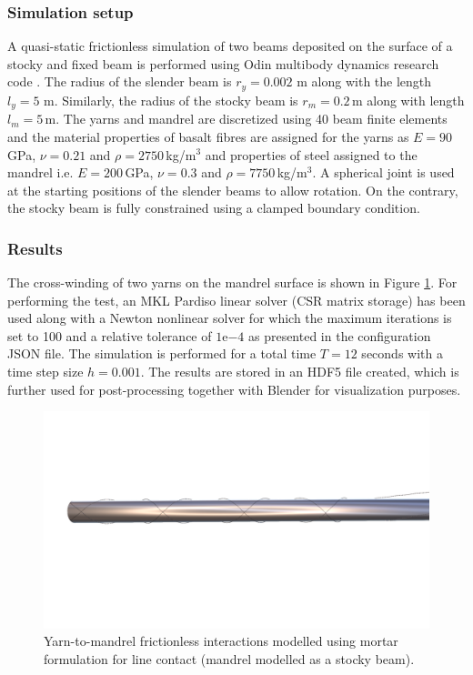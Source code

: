 \subsubsection{Simulation setup}
A quasi-static frictionless simulation of two beams deposited on the surface of a stocky and fixed beam is performed using Odin multibody dynamics research code \cite{odin2022}. The radius of the slender beam is $r_y = 0.002$ m along with the length $l_y = 5$ m. Similarly, the radius of the stocky beam is $r_m = 0.2\,$m along with length $l_m = 5\,$m. The yarns and mandrel are discretized using 40 beam finite elements and the material properties of basalt fibres are assigned for the yarns as $E = 90\,$GPa, $\nu = 0.21$ and $\rho = 2750\,$kg/m$^3$ and properties of steel assigned to the mandrel i.e. $E = 200\,$GPa, $\nu = 0.3$ and $\rho = 7750\,$kg/m$^3$. A spherical joint is used at the starting positions of the slender beams to allow rotation. On the contrary, the stocky beam is fully constrained using a clamped boundary condition.

\subsubsection{Results}
The cross-winding of two yarns on the mandrel surface is shown in Figure \ref{testsetup}. For performing the test, an MKL Pardiso linear solver (CSR matrix storage) has been used along with a Newton nonlinear solver for which the maximum iterations is set to 100 and a relative tolerance of $1\mathrm{e}{-4}$ as presented in the configuration JSON file. The simulation is performed for a total time $T = 12$ seconds with a time step size $h = 0.001$. The results are stored in an HDF5 file created, which is further used for post-processing together with Blender for visualization purposes.

\begin{figure}[h]
    \centering
    \includegraphics[width=400pt]{figures/mortaryarnmandrel_1.png}
    \caption{Yarn-to-mandrel frictionless interactions modelled using mortar formulation for line contact (mandrel modelled as a stocky beam).}
    \label{testsetup}
\end{figure}

















